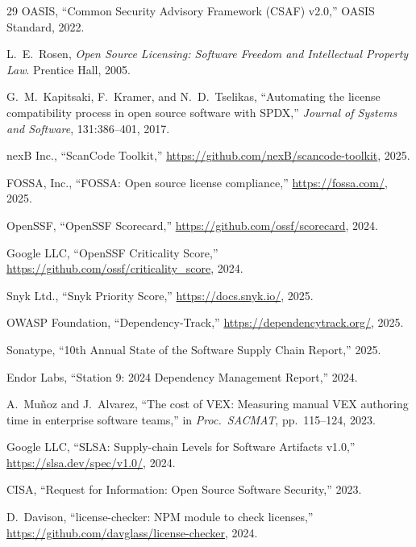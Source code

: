 \documentclass[11pt,twocolumn]{article}
\begin{document}
\begin{thebibliography}{29}
OASIS,
``Common Security Advisory Framework (CSAF) v2.0,''
OASIS Standard, 2022.

L.\ E.\ Rosen,
\emph{Open Source Licensing: Software Freedom and Intellectual Property Law}.
Prentice Hall, 2005.

G.\ M.\ Kapitsaki, F.\ Kramer, and N.\ D.\ Tselikas,
``Automating the license compatibility process in open source software with SPDX,''
\emph{Journal of Systems and Software}, 131:386--401, 2017.

nexB Inc.,
``ScanCode Toolkit,''
\url{https://github.com/nexB/scancode-toolkit}, 2025.

FOSSA, Inc.,
``FOSSA: Open source license compliance,''
\url{https://fossa.com/}, 2025.

OpenSSF,
``OpenSSF Scorecard,''
\url{https://github.com/ossf/scorecard}, 2024.

Google LLC,
``OpenSSF Criticality Score,''
\url{https://github.com/ossf/criticality_score}, 2024.

Snyk Ltd.,
``Snyk Priority Score,''
\url{https://docs.snyk.io/}, 2025.

OWASP Foundation,
``Dependency-Track,''
\url{https://dependencytrack.org/}, 2025.

Sonatype,
``10th Annual State of the Software Supply Chain Report,'' 2025.

Endor Labs,
``Station 9: 2024 Dependency Management Report,'' 2024.

A.\ Mu\~{n}oz and J.\ Alvarez,
``The cost of VEX: Measuring manual VEX authoring time in enterprise software teams,''
in \emph{Proc.\ SACMAT}, pp.\ 115--124, 2023.

Google LLC,
``SLSA: Supply-chain Levels for Software Artifacts v1.0,''
\url{https://slsa.dev/spec/v1.0/}, 2024.

CISA,
``Request for Information: Open Source Software Security,'' 2023.

D.\ Davison,
``license-checker: NPM module to check licenses,''
\url{https://github.com/davglass/license-checker}, 2024.

\end{thebibliography}
\end{document}
